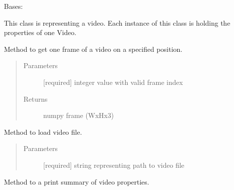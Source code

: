 \documentclass[letterpaper,10pt,english,openany,oneside]{sphinxmanual}
\begin{document}
\begin{fulllineitems}
\label{\detokenize{Video:stc.Video.Video}}
Bases: 

This class is representing a video. Each instance of this class is holding the properties of one Video.

\begin{fulllineitems}
\label{\detokenize{Video:stc.Video.Video.getFrame}}
Method to get one frame of a video on a specified position.
\begin{quote}\begin{description}
\item[{Parameters}] \leavevmode
{} \textendash{} {[}required{]} integer value with valid frame index

\item[{Returns}] \leavevmode
numpy frame (WxHx3)

\end{description}\end{quote}

\end{fulllineitems}


\begin{fulllineitems}
\label{\detokenize{Video:stc.Video.Video.load}}
Method to load video file.
\begin{quote}\begin{description}
\item[{Parameters}] \leavevmode
{} \textendash{} {[}required{]} string representing path to video file

\end{description}\end{quote}

\end{fulllineitems}


\begin{fulllineitems}
\label{\detokenize{Video:stc.Video.Video.printVIDInfo}}
Method to a print summary of video properties.

\end{fulllineitems}


\end{fulllineitems}
\end{document}
